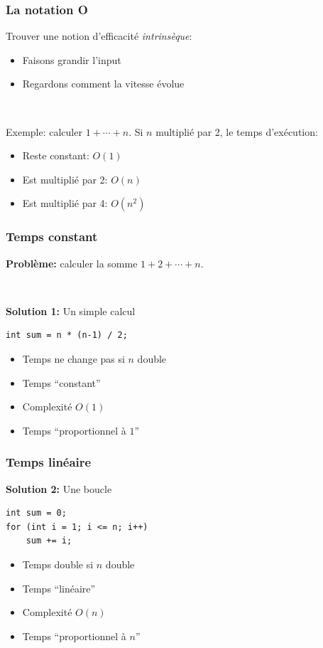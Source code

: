 \documentclass[12pt]{beamer}
\begin{document}
\begin{frame}
\frametitle{La notation O}
Trouver une notion d'efficacité \emph{intrinsèque}:
\begin{itemize}
\item Faisons grandir l'input
\item Regardons comment la vitesse évolue
\end{itemize}

~

Exemple: calculer $1+\cdots+n$. Si $n$ multiplié par 2, le temps d'exécution:
\begin{itemize}
\item Reste constant: $O(1)$
\item Est multiplié par 2: $O(n)$
\item Est multiplié par 4: $O(n^2)$
\end{itemize}
\end{frame}

\begin{frame}[fragile]
\frametitle{Temps constant}
\textbf{Problème:} calculer la somme $1+2+\cdots+n$.

~

\textbf{Solution 1:} Un simple calcul
\begin{lstlisting}
int sum = n * (n-1) / 2;
\end{lstlisting}
\begin{itemize}
\item Temps ne change pas si $n$ double
\item Temps ``constant''
\item Complexité $O(1)$
\item Temps ``proportionnel à $1$''
\end{itemize}
\end{frame}

\begin{frame}[fragile]
\frametitle{Temps linéaire}
\textbf{Solution 2:} Une boucle
\begin{lstlisting}
int sum = 0;
for (int i = 1; i <= n; i++)
    sum += i;
\end{lstlisting}
\begin{itemize}
\item Temps double si $n$ double
\item Temps ``linéaire''
\item Complexité $O(n)$
\item Temps ``proportionnel à $n$''
\end{itemize}
\end{frame}
\end{document}
